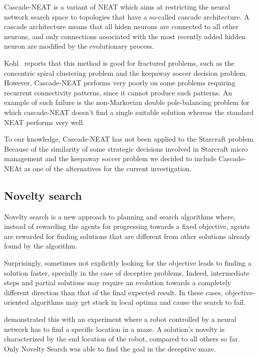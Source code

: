 Cascade-NEAT is a variant of NEAT which aims at restricting the neural
network search space to topologies that have a so-called cascade
architecture. A cascade architecture means that all hiden neurons are
connected to all other neurons, and only connections associated with
the most recently added hidden neuron are modified by the evolutionary
process.

Kohl~\cite{KoAS09,KoMi09} reports that this method is good for
fractured problems, such as the concentric spiral clustering problem
and the keepaway soccer decision problem. However, Cascade-NEAT
performs very poorly on some problems requiring recurrent connectivity
patterns, since it cannot produce such patterns. An example of such
failure is the non-Markovian double pole-balancing problem for which
cascade-NEAT doesn't find a single suitable solution whereas the
standard NEAT performs very well.

To our knowledge, Cascade-NEAT has not been applied to the Starcraft
problem. Because of the similarity of some strategic decisions
involved in Starcraft micro management and the keepaway soccer problem
we decided to include Cascade-NEAt as one of the alternatives for the
current investigation.

\subsection{Novelty search}\label{subsec:novelty-search}

Novelty search is a new approach to planning and search algorithms
where, instead of rewarding the agents for progressing towards a fixed
objective, agents are rewarded for finding solutions that are different
from other solutions already found by the algorithm.

Surprisingly, sometimes not explicitly looking for the objective leads
to finding a solution faster, specially in the case of deceptive
problems.  Indeed, intermediate steps and partial solutions may
require an evolution towards a completely different direction than
that of the final expected result. In these cases, objective-oriented
algorithms may get stuck in local optima and cause the search to
fail.

\citet{LeSt11} demonstrated this with an experiment where a robot
controlled by a neural network has to find a specific location in a
maze. A solution's novelty is characterized by the end location of the
robot, compared to all others so far. Only Novelty Search was able to
find the goal in the deceptive maze.

